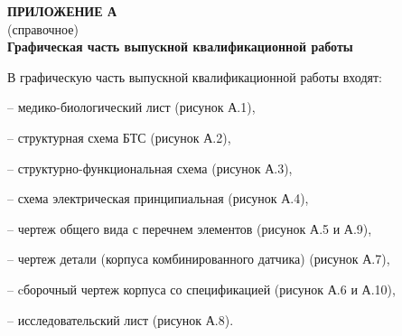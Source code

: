 \newpage
\begin{center}
\textbf{ПРИЛОЖЕНИЕ А}\\
(справочное)\\
\textbf{Графическая часть выпускной квалификационной работы}
\end{center}
\vspace{6mm}

В графическую часть выпускной квалификационной работы входят:

– медико-биологический лист (рисунок А.1),

– структурная схема БТС (рисунок А.2),

– структурно-функциональная схема (рисунок А.3),

– схема электрическая принципиальная (рисунок А.4),

– чертеж общего вида с перечнем элементов (рисунок А.5 и А.9),

– чертеж детали (корпуса комбинированного датчика) (рисунок А.7),

– cборочный чертеж корпуса со спецификацией (рисунок А.6 и А.10),

– исследовательский лист (рисунок А.8).


